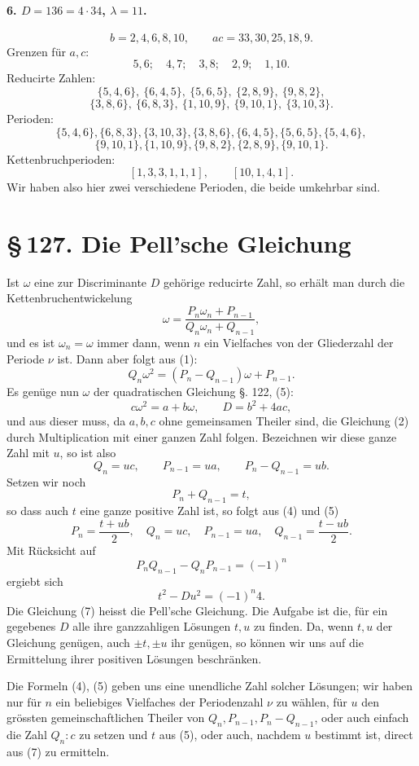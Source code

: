 \documentclass[11pt]{article}
\providecommand{\sect}[2]{\section*{\S\,#1. #2}}
\begin{document}
\paragraph{6. $D=136=4\cdot34$, $\lambda=11$.}
\[
        b=2,4,6,8,10,\qquad ac=33,30,25,18,9.
\]
Grenzen für $a,c$:
\[
        5,6;\quad 4,7;\quad 3,8;\quad 2,9;\quad 1,10.
\]
Reducirte Zahlen:
\[
\{5,4,6\},\ \{6,4,5\},\ \{5,6,5\},\ \{2,8,9\},\ \{9,8,2\},
\]
\[
\{3,8,6\},\ \{6,8,3\},\ \{1,10,9\},\ \{9,10,1\},\ \{3,10,3\}.
\]
Perioden:
\[
\{5,4,6\},\{6,8,3\},\{3,10,3\},\{3,8,6\},\{6,4,5\},\{5,6,5\},\{5,4,6\},
\]
\[
\{9,10,1\},\{1,10,9\},\{9,8,2\},\{2,8,9\},\{9,10,1\}.
\]
Kettenbruchperioden:
\[
        [1,3,3,1,1,1],\qquad [10,1,4,1].
\]
Wir haben also hier zwei verschiedene Perioden, die beide umkehrbar sind.

\sect{127}{Die Pell'sche Gleichung}

Ist $\omega$ eine zur Discriminante $D$ gehörige reducirte Zahl, so erhält man durch die Kettenbruchentwickelung
\[
\tag{1}        \omega=\frac{P_n\omega_n+P_{n-1}}{Q_n\omega_n+Q_{n-1}},
\]
und es ist $\omega_n=\omega$ immer dann, wenn $n$ ein Vielfaches von der Gliederzahl der Periode $\nu$ ist. Dann aber folgt aus (1):
\[
\tag{2}        Q_n\omega^2=(P_n-Q_{n-1})\omega+P_{n-1}.
\]
Es genüge nun $\omega$ der quadratischen Gleichung §. 122, (5):
\[
\tag{3}        c\omega^2=a+b\omega,\qquad D=b^2+4ac,
\]
und aus dieser muss, da $a,b,c$ ohne gemeinsamen Theiler sind, die Gleichung (2) durch Multiplication mit einer ganzen Zahl folgen. Bezeichnen wir diese ganze Zahl mit $u$, so ist also
\[
\tag{4}        Q_n=uc,\qquad P_{n-1}=ua,\qquad P_n-Q_{n-1}=ub.
\]
Setzen wir noch
\[
\tag{5}        P_n+Q_{n-1}=t,
\]
so dass auch $t$ eine ganze positive Zahl ist, so folgt aus (4) und (5)
\[
\tag{6}        P_n=\frac{t+ub}{2},\quad Q_n=uc,\quad
        P_{n-1}=ua,\quad Q_{n-1}=\frac{t-ub}{2}.
\]
Mit Rücksicht auf
\[
        P_nQ_{n-1}-Q_nP_{n-1}=(-1)^n
\]
ergiebt sich
\[
\tag{7}        t^2-Du^2=(-1)^n4.
\]
Die Gleichung (7) heisst die Pell'sche Gleichung. Die Aufgabe ist die, für ein gegebenes $D$ alle ihre ganzzahligen Lösungen $t,u$ zu finden. Da, wenn $t,u$ der Gleichung genügen, auch $\pm t,\pm u$ ihr genügen, so können wir uns auf die Ermittelung ihrer positiven Lösungen beschränken.

Die Formeln (4), (5) geben uns eine unendliche Zahl solcher Lösungen; wir haben nur für $n$ ein beliebiges Vielfaches der Periodenzahl $\nu$ zu wählen, für $u$ den grössten gemeinschaftlichen Theiler von $Q_n,P_{n-1},P_n-Q_{n-1}$, oder auch einfach die Zahl $Q_n:c$ zu setzen und $t$ aus (5), oder auch, nachdem $u$ bestimmt ist, direct aus (7) zu ermitteln.
\end{document}
